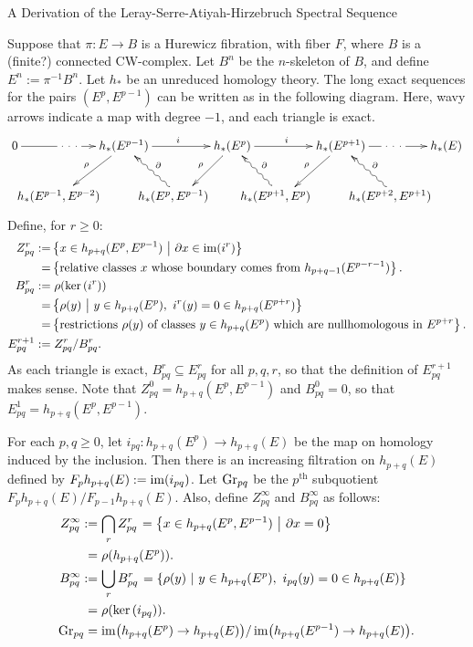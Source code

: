 \documentclass[11pt]{article}
\newcommand{\myheading}[1]
{{\noindent\Large #1}

}
\newcommand{\shrt}[1]{\makebox[0cm]{\ensuremath{#1}}}
\begin{document}
\myheading{A Derivation of the Leray-Serre-Atiyah-Hirzebruch Spectral Sequence}
Suppose that $\pi:E\to B$ is a Hurewicz fibration, with fiber $F$, where $B$ is a (finite?) connected CW-complex. Let $B^n$ be the $n$-skeleton of $B$, and define $E^n:=\pi^{-1}B^n$. Let $h_*$ be an unreduced homology theory. The long exact sequences for the pairs $(E^p,E^{p-1})$ can be written as in the following diagram. Here, wavy arrows indicate a map with degree $-1$, and each triangle is exact.
\[\xymatrix@C=.5cm{
0\ar[rr]|{\ \cdot\ \cdot\ \cdot\ }&&h_*(E^{p-1})\ar[rr]^i\ar[ld]_\rho&&h_*(E^{p})\ar[rr]^i \ar[ld]_\rho&&h_*(E^{p+1})\ar[ld]_\rho
\ar[rr]|{\ \cdot\ \cdot\ \cdot\ }&&h_*(E)\\
&\ \ \ \ \shrt{h_*(E^{p-1},E^{p-2})}\phantom{{5\choose3}}&&
\shrt{h_*(E^{p},E^{p-1})}\phantom{{5\choose3}}\ar@{~>}[lu]_\partial&&
\shrt{h_*(E^{p+1},E^{p})}\phantom{{5\choose3}}\ar@{~>}[lu]_\partial&&
\shrt{h_*(E^{p+2},E^{p+1})}\phantom{{5\choose3}}\ar@{~>}[lu]_\partial
}\]
Define, for $r\geq0$:
\begin{alignat*}{2}
Z_{pq}^r:=&\left\{x\in h_{p+q}(E^p,E^{p-1})\ \middle|\ \partial x\in\operatorname{im}(i^{r})\right\}\\
=&\left\{\text{relative classes $x$ whose boundary comes from $h_{p+q-1}(E^{p-r-1})$}\right\}.\\
B_{pq}^r:=&\left.\rho(\textup{ker}\,(i^r))\right.\\
=&\left\{\rho(y)\ \middle|\ y\in h_{p+q}(E^p),\ i^r(y)=0\in h_{p+q}(E^{p+r})\right\}\\
=&\left\{\text{restrictions $\rho(y)$ of classes $y\in h_{p+q}(E^p)$ which are nullhomologous in $E^{p+r}$}\right\}.\\
E_{pq}^{r+1}:=&\left.Z_{pq}^r/B_{pq}^r.\right.
\end{alignat*}
As each triangle is exact, $B_{pq}^r\subseteq E_{pq}^r$ for all $p,q,r$, so that the definition of $E_{pq}^{r+1}$ makes sense.
Note that $Z_{pq}^0=h_{p+q}(E^p,E^{p-1})$ and $B_{pq}^0=0$, so that $E_{pq}^1=h_{p+q}(E^p,E^{p-1})$.

For each $p,q\geq0$, let $i_{pq}:h_{p+q}(E^p)\to h_{p+q}(E)$ be the map on homology induced by the inclusion. Then there is an increasing filtration on $h_{p+q}(E)$ defined by $F_{p}h_{p+q}(E):=\operatorname{im}(i_{pq})$. Let $\textup{Gr}_{pq}$ be the $p^\text{th}$ subquotient $F_{p}h_{p+q}(E)/F_{p-1}h_{p+q}(E)$. Also, define $Z^\infty_{pq}$ and $B^\infty_{pq}$ as follows:
\begin{alignat*}{2}
Z_{pq}^\infty:=&\left.\bigcap_r Z_{pq}^r\right.=\left\{x\in h_{p+q}(E^p,E^{p-1})\ \middle|\ \partial x=0\right\}\\
=&\left.\rho(h_{p+q}(E^p)).\right.\\
B_{pq}^\infty:=&\left.\bigcup_r B_{pq}^r\right.=\left\{\rho(y)\ \middle|\ y\in h_{p+q}(E^p),\ i_{pq}(y)=0\in h_{p+q}(E)\right\}\\
=&\left.\rho(\textup{ker}\, (i_{pq})).\right.\\
\textup{Gr}_{pq}=&\left.\operatorname{im}\bigl(h_{p+q}(E^p)\rightarrow h_{p+q}(E)\bigr)/\operatorname{im}\bigl(h_{p+q}(E^{p-1})\rightarrow h_{p+q}(E)\bigr).\right.
\end{alignat*}
\end{document}
